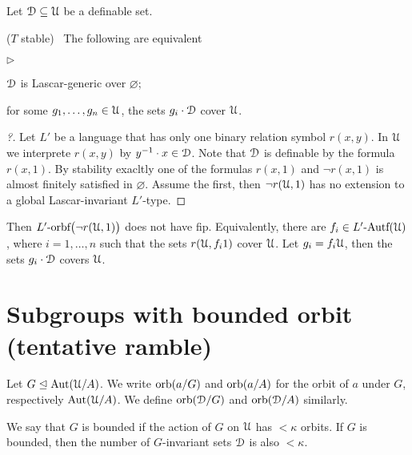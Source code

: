 \documentclass{amsproc}
\newcommand{\mylabel}[1]{{#1}\hfill}
\renewenvironment{itemize}
  {\begin{list}{$\triangleright$}{%
  \setlength{\parskip}{0mm}
  \setlength{\topsep}{.4\baselineskip}
  \setlength{\rightmargin}{0mm}
  \setlength{\listparindent}{0mm}
  \setlength{\itemindent}{0mm}
  \setlength{\labelwidth}{3ex}
  \setlength{\itemsep}{.2\baselineskip}
  \setlength{\parsep}{.2\baselineskip}
  \setlength{\partopsep}{0mm}
  \setlength{\labelsep}{1ex}
  \setlength{\leftmargin}{\labelwidth+\labelsep}
  \let\makelabel\mylabel}}{%
\end{list}}
\begin{document}
Let $\EuScript D\subseteq\EuScript U$ be a definable set.


\begin{theorem}
  ($T$ stable) \ The following are equivalent
  \begin{itemize}
    \item[1.] $\EuScript D$ is Lascar-generic over $\varnothing$;
    \item[2.] for some $g_1,\dots,g_n\in\EuScript U$, the sets $g_i\cdot\EuScript D$ cover $\EuScript U$. 
  \end{itemize}
\end{theorem}

\begin{proof}[?]
  Let $L'$ be a language that has only one binary relation symbol $r(x,y)$.
  In $\EuScript U$ we interprete $r(x,y)$ by $y^{-1}\cdot x\in\EuScript D$.
  Note that $\EuScript D$ is definable by the formula $r(x,1)$.
  By stability exacltly one of the formulas $r(x,1)$ and $\neg r(x,1)$ is almost finitely satisfied in $\varnothing$.
  Assume the first, then $\neg r(\EuScript U,1)$ has no extension to a global Lascar-invariant $L'$-type.
\end{proof}

Then $L'\mbox{-orbf}\big(\neg r(\EuScript U,1)\big)$ does not have fip.
Equivalently, there are $f_i\in L'\mbox{-Autf}({\EuScript U})$, where $i=1,\dots,n$ such that the sets $r(\EuScript U,f_i1)$ cover $\EuScript U$.
Let $g_i=f_i\EuScript U$, then the sets $g_i\cdot\EuScript D$ covers $\EuScript U$.



\section{Subgroups with bounded orbit (tentative ramble)}

Let $G\trianglelefteq{\rm Aut}(\EuScript U/A)$.
We write ${\rm orb}(a/G)$ and ${\rm orb}(a/A)$ for the orbit of $a$ under $G$, respectively ${\rm Aut}(\EuScript U/A)$.
We define ${\rm orb}({\EuScript D}/G)$ and ${\rm orb}({\EuScript D}/A)$ similarly.

We say that $G$ is bounded if the action of $G$ on $\EuScript U$ has $<\kappa$ orbits.
If $G$ is bounded, then the number of $G$-invariant sets $\EuScript D$ is also $<\kappa$.
\end{document}
